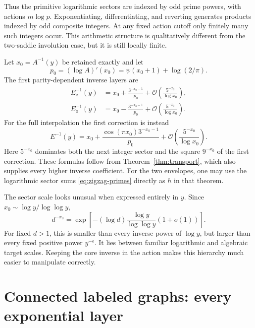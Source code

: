 \documentclass[11pt,a4paper]{article}
\numberwithin{equation}{section}
\theoremstyle{definition}
\theoremstyle{remark}
\newcommand{\bigO}{\mathcal O}
\begin{document}
Thus the primitive logarithmic sectors are indexed by odd prime powers, with actions $m\log p$. Exponentiating, differentiating, and reverting generates products indexed by odd composite integers. At any fixed action cutoff only finitely many such integers occur. This arithmetic structure is qualitatively different from the two-saddle involution case, but it is still locally finite.

Let $x_0=A^{-1}(y)$ be retained exactly and let
\[
 p_0=(\log A)'(x_0)=\psi(x_0+1)+\log(2/\pi).
\]
The first parity-dependent inverse layers are
\begin{align}
 E_{\mathrm e}^{-1}(y)&=x_0+\frac{3^{-x_0-1}}{p_0}
                  +\bigO\!\left(\frac{5^{-x_0}}{\log x_0}\right),\nonumber\\
 E_{\mathrm o}^{-1}(y)&=x_0-\frac{3^{-x_0-1}}{p_0}
                  +\bigO\!\left(\frac{5^{-x_0}}{\log x_0}\right).
 \label{eq:zigzag-inverse-parity}
\end{align}
For the full interpolation the first correction is instead
\begin{equation}
 E^{-1}(y)=x_0+\frac{\cos(\pi x_0)3^{-x_0-1}}{p_0}
            +\bigO\!\left(\frac{5^{-x_0}}{\log x_0}\right).
 \label{eq:zigzag-full-inverse}
\end{equation}
Here $5^{-x_0}$ dominates both the next integer sector and the square $9^{-x_0}$ of the first correction. These formulas follow from Theorem~\ref{thm:transport}, which also supplies every higher inverse coefficient. For the two envelopes, one may use the logarithmic sector sums \eqref{eq:zigzag-primes} directly as $h$ in that theorem.

The sector scale looks unusual when expressed entirely in $y$. Since $x_0\sim\log y/\log\log y$,
\begin{equation}
 d^{-x_0}=\exp\left[-(\log d)\frac{\log y}{\log\log y}(1+o(1))\right].
 \label{eq:zigzag-y-scale}
\end{equation}
For fixed $d>1$, this is smaller than every inverse power of $\log y$, but larger than every fixed positive power $y^{-\epsilon}$. It lies between familiar logarithmic and algebraic target scales. Keeping the core inverse in the action makes this hierarchy much easier to manipulate correctly.

\section{Connected labeled graphs: every exponential layer}
\label{sec:graphs}
\end{document}
